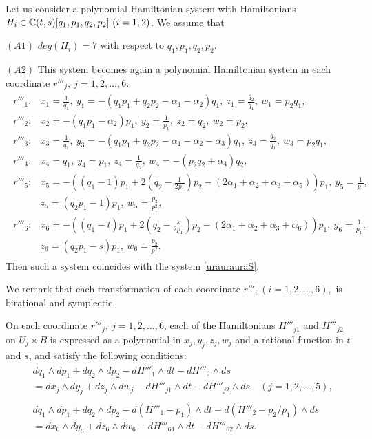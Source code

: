 \begin{thm}\label{holoURAURAURA}
Let us consider a polynomial Hamiltonian system with Hamiltonians $H_i \in {\Bbb C}(t,s)[q_1,p_1,q_2,p_2] \ (i=1,2)$. We assume that

$(A1)$ $deg(H_i)=7$ with respect to $q_1,p_1,q_2,p_2$.

$(A2)$ This system becomes again a polynomial Hamiltonian system in each coordinate $r'''_j, \ j=1,2,\dots,6${\rm : \rm}
\begin{align}
\begin{split}
r'''_1:&x_1=\frac{1}{q_1}, \ y_1=-(q_1p_1+q_2p_2-\alpha_1-\alpha_2)q_1, \ z_1=\frac{q_2}{q_1}, \ w_1=p_2q_1,\\
r'''_2:&x_2=-(q_1p_1-\alpha_2)p_1, \ y_2=\frac{1}{p_1}, \ z_2=q_2, \ w_2=p_2,\\
r'''_3:&x_3=\frac{1}{q_1},\ y_3=-(q_1p_1+q_2p_2-\alpha_1-\alpha_2-\alpha_3)q_1,\ z_3=\frac{q_2}{q_1},\ w_3=p_2q_1,\\
r'''_4:&x_4=q_1, \ y_4=p_1, \ z_4=\frac{1}{q_2}, \ w_4=-(p_2q_2+\alpha_4)q_2,\\
r'''_5:&x_5=-((q_1-1)p_1+2(q_2-\frac{1}{2p_1})p_2-(2\alpha_1+\alpha_2+\alpha_3+\alpha_5))p_1, \ y_5=\frac{1}{p_1},\\ 
&z_5=(q_2p_1-1)p_1, \ w_5=\frac{p_2}{p_1^2},\\
r'''_6:&x_6=-((q_1-t)p_1+2(q_2-\frac{s}{2p_1})p_2-(2\alpha_1+\alpha_2+\alpha_3+\alpha_6))p_1, \ y_6=\frac{1}{p_1},\\
&z_6=(q_2p_1-s)p_1, \ w_6=\frac{p_2}{p_1^2}.
\end{split}
\end{align}
Then such a system coincides with the system \eqref{uraurauraS}.
\end{thm}
We remark that each transformation of each coordinate $r'''_i \ (i=1,2,\dots,6),$ is birational and symplectic.

\begin{prop}
On each coordinate $r'''_j, \ j=1,2,\dots,6$, each of the  Hamiltonians $H'''_{j1}$ and $H'''_{j2}$ on $U_j \times B$ is expressed as a polynomial in $x_j,y_j,z_j,w_j$ and a rational function in $t$ and $s$, and satisfy the following conditions{\rm: \rm}
\begin{align}
\begin{split}
&dq_1 \wedge dp_1 +dq_2 \wedge dp_2 - dH'''_1 \wedge dt- dH'''_2 \wedge ds\\
&=dx_j \wedge dy_j +dz_j \wedge dw_j - dH'''_{j1} \wedge dt- dH'''_{j2} \wedge ds \quad (j=1,2,\dots,5),
\end{split}\\
\begin{split}
&dq_1 \wedge dp_1 +dq_2 \wedge dp_2 - d(H'''_1-p_1) \wedge dt- d(H'''_2-p_2/p_1) \wedge ds\\
&=dx_6 \wedge dy_6 +dz_6 \wedge dw_6 - dH'''_{61} \wedge dt- dH'''_{62} \wedge ds.
\end{split}
\end{align}
\end{prop}

